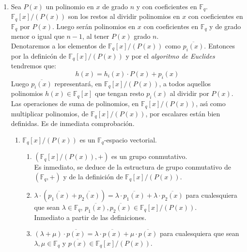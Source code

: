 \begin{enumerate}
\item Sea $P(x)$ un polinomio en $x$ de grado $n$ y con coeficientes en
$\mathbb{F}_q$.\\

$\mathbb{F}_q[x]/(P(x))$ son los restos al dividir polinomios en $x$ con
coeficientes en $\mathbb{F}_q$ por $P(x)$. Luego ser\'an polinomios en $x$
con coeficientes en $\mathbb{F}_q$ y de grado menor o igual que $n-1$, al
tener $P(x)$ grado $n$.\\

Denotaremos a los elementos de $\mathbb{F}_q[x]/(P(x))$ como 
$\overline{p_i(x)}$. Entonces por la definic\'on de $\mathbb{F}_q[x]/(P(x))$ y
por el \emph{algoritmo de Euclides} tendremos que:
\begin{displaymath}
h(x) = h_i(x)\cdot P(x) + p_i(x)
\end{displaymath}
Luego $\overline{p_i(x)}$ representar\'a, en $\mathbb{F}_q[x]/(P(x))$, a todos
aquellos polinomios $h(x)\in \mathbb{F}_q[x]$ que tengan resto $p_i(x)$ al
dividir por $P(x)$.\\

Las operaciones de suma de polinomios, en $\mathbb{F}_q[x]/(P(x))$, as\'{\i}
como multiplicar polinomios, de $\mathbb{F}_q[x]/(P(x))$, por escalares est\'an
bien definidas. Es de inmediata comprobaci\'on.\newpage
\begin{enumerate}
\item $\mathbb{F}_q[x]/(P(x))$ es un $\mathbb{F}_q$-espacio vectorial.\\
\begin{enumerate}
\item $(\mathbb{F}_q[x]/(P(x)),+)$ es un grupo conmutativo.\\

Es inmediato, se deduce de la estructura de grupo conmutativo de
$(\mathbb{F}_q,+)$ y de la definici\'on de $\mathbb{F}_q[x]/(P(x))$.\\

\item $\lambda\cdot (\overline{p_1(x)}+\overline{p_2(x)})= \lambda\cdot
\overline{p_1(x)}+\lambda\cdot \overline{p_2(x)}$ para cualesquiera que sean
$\lambda\in\mathbb{F}_q$, $\overline{p_1(x)},\overline{p_2(x)}\in
\mathbb{F}_q[x]/(P(x))$.\\

Inmediato a partir de las definiciones.\\
\item $(\lambda+\mu)\cdot\overline{p(x)}=\lambda\cdot\overline{p(x)}+\mu\cdot
\overline{p(x)}$ para cualesquiera que sean $\lambda,\mu\in \mathbb{F}_q$ y
$\overline{p(x)}\in \mathbb{F}_q[x]/(P(x))$.\\


\end{enumerate}
\end{enumerate}
\end{enumerate}
